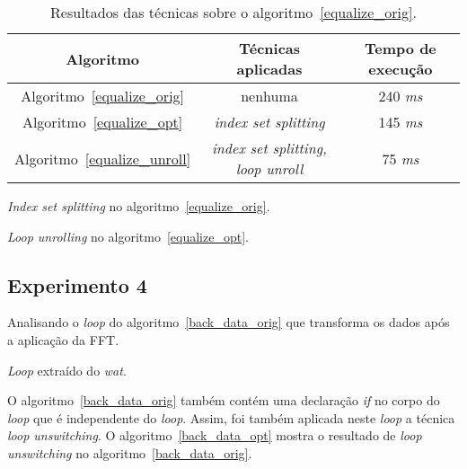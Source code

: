 \begin{table}[H]
  \caption{Resultados das técnicas sobre o algoritmo~\ref{equalize_orig}.}
  \label{tabela_equalize}
\begin{center}
  \begin{tabular}{c|c|c}
    Algoritmo & Técnicas aplicadas & Tempo de execução\\
    \hline
    Algoritmo~\ref{equalize_orig} & nenhuma & 240 \textit{ms} \\
    \hline
    Algoritmo~\ref{equalize_opt} & \textit{index set splitting} & 145 \textit{ms} \\
    \hline
    Algoritmo~\ref{equalize_unroll} & \textit{index set splitting, loop unroll}
                                    & 75 \textit{ms} \\
    \hline
  \end{tabular}
\end{center}
\end{table}



\begin{algorithm}[H]
  \caption{\textit{Index set splitting} no algoritmo~\ref{equalize_orig}.}
\label{equalize_opt}

\end{algorithm}

\begin{algorithm}[H]
  \caption{\textit{Loop unrolling} no algoritmo~\ref{equalize_opt}.}
\label{equalize_unroll}

\end{algorithm}

\subsection{Experimento 4}

Analisando o \textit{loop} do algoritmo~\ref{back_data_orig} que transforma os 
dados após a aplicação da FFT.

\begin{algorithm}[H]
  \caption{\textit{Loop} extraído do \textit{wat}.}
\label{back_data_orig}

\end{algorithm}

O algoritmo~\ref{back_data_orig} também contém uma declaração \textit{if} no corpo do
\textit{loop} que é independente do \textit{loop}. Assim, foi também
aplicada neste \textit{loop} a técnica \textit{loop unswitching}.
O algoritmo~\ref{back_data_opt} mostra o resultado de \textit{loop unswitching} no
algoritmo~\ref{back_data_orig}.

